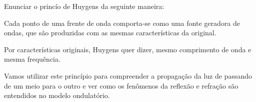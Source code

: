     Enunciar o princío de Huygens da seguinte maneira:

    \begin{principio}[Huygens]
        Cada ponto de uma frente de onda comporta-se como uma fonte geradora de ondas, que são produzidas com as mesmas características da original.
    \end{principio}

    Por características originais, Huygens quer dizer, mesmo comprimento de onda e mesma frequência.

    Vamos utilizar este princípio para compreender a propagação da luz de passando de um meio para o outro e ver como os fenômenos da reflexão e refração são entendidos no modelo ondulatório.
    

 
        
            
        
        
        

    

